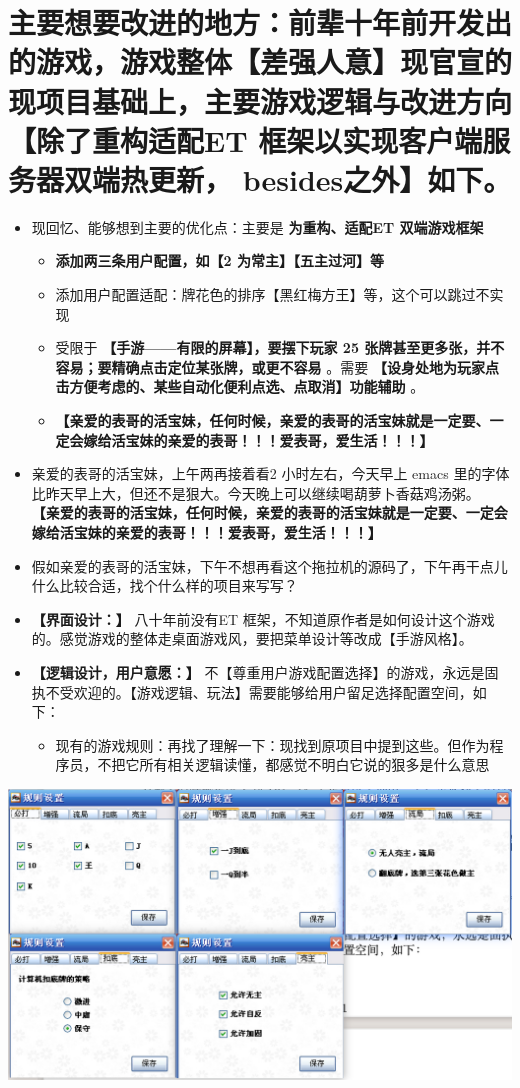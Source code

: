 \documentclass[9pt, b5paper]{article}
\begin{document}
\section{主要想要改进的地方：前辈十年前开发出的游戏，游戏整体【差强人意】现官宣的现项目基础上，主要游戏逻辑与改进方向【除了重构适配ET 框架以实现客户端服务器双端热更新， besides之外】如下。}
\label{sec-2}
\begin{itemize}
\item 现回忆、能够想到主要的优化点：主要是 \textbf{为重构、适配ET 双端游戏框架}
\begin{itemize}
\item \textbf{添加两三条用户配置，如【2 为常主】【五主过河】等}
\item 添加用户配置适配：牌花色的排序【黑红梅方王】等，这个可以跳过不实现
\item 受限于 \textbf{【手游——有限的屏幕】，要摆下玩家 25 张牌甚至更多张，并不容易；要精确点击定位某张牌，或更不容易} 。需要 \textbf{【设身处地为玩家点击方便考虑的、某些自动化便利点选、点取消】功能辅助} 。
\item \textbf{【亲爱的表哥的活宝妹，任何时候，亲爱的表哥的活宝妹就是一定要、一定会嫁给活宝妹的亲爱的表哥！！！爱表哥，爱生活！！！】}
\end{itemize}
\item 亲爱的表哥的活宝妹，上午两再接着看2 小时左右，今天早上 emacs 里的字体比昨天早上大，但还不是狠大。今天晚上可以继续喝葫萝卜香菇鸡汤粥。 \textbf{【亲爱的表哥的活宝妹，任何时候，亲爱的表哥的活宝妹就是一定要、一定会嫁给活宝妹的亲爱的表哥！！！爱表哥，爱生活！！！】}
\item 假如亲爱的表哥的活宝妹，下午不想再看这个拖拉机的源码了，下午再干点儿什么比较合适，找个什么样的项目来写写？
\item \textbf{【界面设计：】} 八十年前没有ET 框架，不知道原作者是如何设计这个游戏的。感觉游戏的整体走桌面游戏风，要把菜单设计等改成【手游风格】。
\item \textbf{【逻辑设计，用户意愿：】} 不【尊重用户游戏配置选择】的游戏，永远是固执不受欢迎的。【游戏逻辑、玩法】需要能够给用户留足选择配置空间，如下：
\begin{itemize}
\item 现有的游戏规则：再找了理解一下：现找到原项目中提到这些。但作为程序员，不把它所有相关逻辑读懂，都感觉不明白它说的狠多是什么意思
\end{itemize}
\end{itemize}

\includegraphics[width=.9\linewidth]{./pic/readme_20230510_160604.png}
\end{document}
